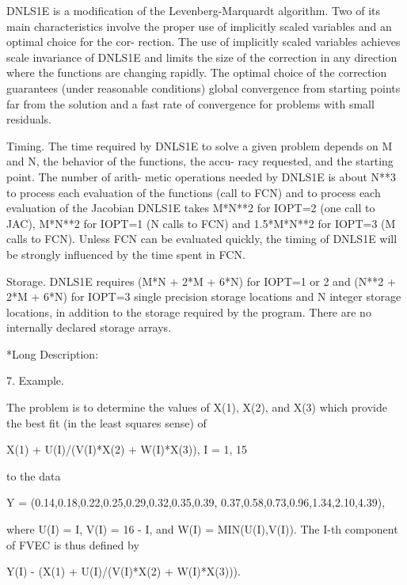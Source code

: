 \documentclass[11pt,twoside,nolof]{starlink}
\begin{document}
\begin{terminalv}
       DNLS1E is a modification of the Levenberg-Marquardt algorithm.
       Two of its main characteristics involve the proper use of
       implicitly scaled variables and an optimal choice for the cor-
       rection.  The use of implicitly scaled variables achieves scale
       invariance of DNLS1E and limits the size of the correction in
       any direction where the functions are changing rapidly.  The
       optimal choice of the correction guarantees (under reasonable
       conditions) global convergence from starting points far from the
       solution and a fast rate of convergence for problems with small
       residuals.

       Timing.  The time required by DNLS1E to solve a given problem
         depends on M and N, the behavior of the functions, the accu-
         racy requested, and the starting point.  The number of arith-
         metic operations needed by DNLS1E is about N**3 to process
         each evaluation of the functions (call to FCN) and to process
         each evaluation of the Jacobian DNLS1E takes M*N**2 for IOPT=2
         (one call to JAC), M*N**2 for IOPT=1 (N calls to FCN) and
         1.5*M*N**2 for IOPT=3 (M calls to FCN).  Unless FCN
         can be evaluated quickly, the timing of DNLS1E will be
         strongly influenced by the time spent in FCN.

       Storage.  DNLS1E requires (M*N + 2*M + 6*N) for IOPT=1 or 2 and
         (N**2 + 2*M + 6*N) for IOPT=3 single precision storage
         locations and N integer storage locations, in addition to
         the storage required by the program.  There are no internally
         declared storage arrays.

 *Long Description:

 7. Example.

       The problem is to determine the values of X(1), X(2), and X(3)
       which provide the best fit (in the least squares sense) of

             X(1) + U(I)/(V(I)*X(2) + W(I)*X(3)),  I = 1, 15

       to the data

             Y = (0.14,0.18,0.22,0.25,0.29,0.32,0.35,0.39,
                  0.37,0.58,0.73,0.96,1.34,2.10,4.39),

       where U(I) = I, V(I) = 16 - I, and W(I) = MIN(U(I),V(I)).  The
       I-th component of FVEC is thus defined by

             Y(I) - (X(1) + U(I)/(V(I)*X(2) + W(I)*X(3))).


\end{terminalv}
\end{document}
